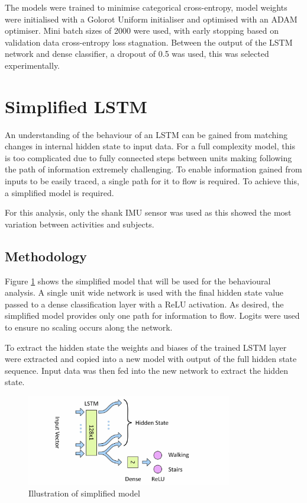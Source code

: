 \documentclass[sensors,article,submit,moreauthors,pdftex]{Definitions/mdpi}
\begin{document}
The models were trained to minimise categorical cross-entropy, model weights were initialised with a Golorot Uniform initialiser\cite{Glorot2010} and optimised with an ADAM optimiser\cite{Kingma2015}.  Mini batch sizes of 2000 were used, with early stopping based on validation data cross-entropy loss stagnation. Between the output of the LSTM network and dense classifier, a dropout of 0.5 was used, this was selected experimentally.



\section{Simplified LSTM}
\label{sec:simplified_model}
An understanding of the behaviour of an LSTM can be gained from matching changes in internal hidden state to input data. For a full complexity model, this is too complicated due to fully connected steps between units making following the path of information extremely challenging. To enable information gained from inputs to be easily traced, a single path for it to flow is required. To achieve this, a simplified model is required. 

For this analysis, only the shank IMU sensor was used as this showed the most variation between activities and subjects.

\subsection{Methodology}
Figure \ref{fig:simplfied_lstm_model} shows the simplified model that will be used for the behavioural analysis. A single unit wide network is used with the final hidden state value passed to a dense classification layer with a ReLU activation. As desired, the simplified model provides only one path for information to flow. Logits were used to ensure no scaling occurs along the network. 

To extract the hidden state the weights and biases of the trained LSTM layer were extracted and copied into a new model with output of the full hidden state sequence. Input data was then fed into the new network to extract the hidden state.

\begin{figure}[!htb]
    \centering
    \includegraphics[width=0.8\textwidth]{Figures/lstm/Simplified_Network.jpg}
    \caption{Illustration of simplified model}
    \label{fig:simplfied_lstm_model}
\end{figure}
\end{document}
